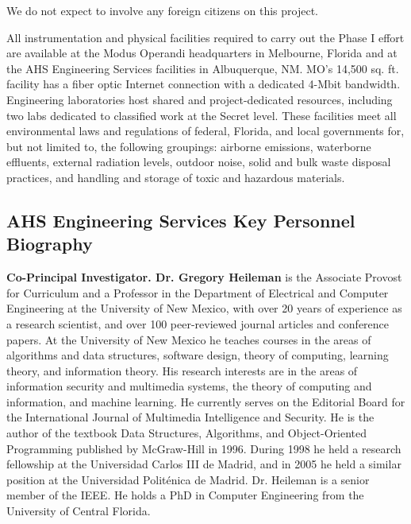\documentclass{sbir}
\begin{document}
{
We do not expect to involve any foreign citizens on this project.

 {}
All instrumentation and physical facilities required to carry out the Phase I effort are available at the Modus Operandi headquarters in Melbourne, Florida and at the AHS Engineering Services facilities in Albuquerque, NM. MO's 14,500 sq. ft. facility has a fiber optic Internet connection with a dedicated 4-Mbit bandwidth. Engineering laboratories host shared and project-dedicated resources, including two labs dedicated to classified work at the Secret level. These facilities meet all environmental laws and regulations of federal, Florida, and local governments for, but not limited to, the following groupings: airborne emissions, waterborne effluents, external radiation levels, outdoor noise, solid and bulk waste disposal practices, and handling and storage of toxic and hazardous materials.

\label{subs}

\subsection{AHS Engineering Services Key Personnel Biography}\label{AHS}

{\bf Co-Principal Investigator. Dr. Gregory Heileman } is the Associate Provost for Curriculum and a Professor in the Department of Electrical and Computer Engineering at the University of New Mexico, with over 20 years of experience as a research scientist, and over 100 peer-reviewed journal articles and conference papers. At the University of New Mexico he teaches courses in the areas of algorithms and data structures, software design, theory of computing, learning theory, and information theory. His research interests are in the areas of information security and multimedia systems, the theory of computing and information, and machine learning. He currently serves on the Editorial Board for the International Journal of Multimedia Intelligence and Security. He is the author of the textbook Data Structures, Algorithms, and Object-Oriented Programming published by McGraw-Hill in 1996. During 1998 he held a research fellowship at the Universidad Carlos III de Madrid, and in 2005 he held a similar position at the Universidad Polit\'enica de Madrid. Dr. Heileman is a senior member of the IEEE. He holds a PhD in Computer Engineering from the University of Central Florida.

}
\end{document}
